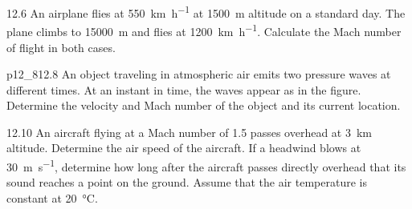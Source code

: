 
\begin{problem}{12.6}
  An airplane flies at \qty{550}{\km\per\hour} at \qty{1500}{\m} altitude on a standard day.
  The plane climbs to \qty{15000}{\m} and flies at \qty{1200}{\km\per\hour}.
  Calculate the Mach number of flight in both cases.
\end{problem}


\begin{problemwithimage}{p12_8}{12.8}
  An object traveling in atmospheric air emits two pressure waves at different times.
  At an instant in time, the waves appear as in the figure.
  Determine the velocity and Mach number of the object and its current location.
\end{problemwithimage}

\begin{problem}{12.10}
  An aircraft flying at a Mach number of \num{1,5} passes overhead at \qty{3}{\km} altitude.
  Determine the air speed of the aircraft.
  If a headwind blows at \qty{30}{\m\per\s}, determine how long after the aircraft passes directly overhead that its sound reaches a point on the ground.
  Assume that the air temperature is constant at \qty{20}{\celsius}.
\end{problem}
